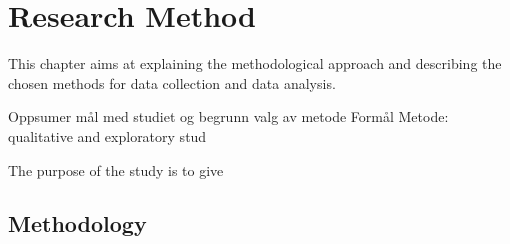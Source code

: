 \chapter{Research Method}
This chapter aims at explaining the methodological approach and describing the chosen methods for data collection and data analysis. 

Oppsumer mål med studiet og begrunn valg av metode 
Formål 
Metode: qualitative and exploratory stud

The purpose of the study is to give 

\section{Methodology}





